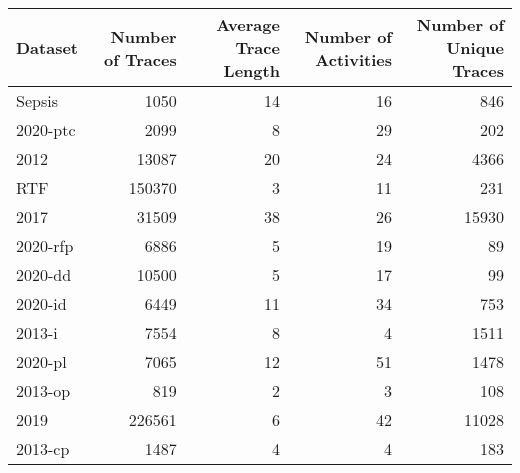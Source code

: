 \begin{tabular}{lrrrr}
\toprule
Dataset & Number of Traces & Average Trace Length & Number of Activities & Number of Unique Traces \\
\midrule
Sepsis & 1050 & 14 & 16 & 846 \\
2020-ptc & 2099 & 8 & 29 & 202 \\
2012 & 13087 & 20 & 24 & 4366 \\
RTF & 150370 & 3 & 11 & 231 \\
2017 & 31509 & 38 & 26 & 15930 \\
2020-rfp & 6886 & 5 & 19 & 89 \\
2020-dd & 10500 & 5 & 17 & 99 \\
2020-id & 6449 & 11 & 34 & 753 \\
2013-i & 7554 & 8 & 4 & 1511 \\
2020-pl & 7065 & 12 & 51 & 1478 \\
2013-op & 819 & 2 & 3 & 108 \\
2019 & 226561 & 6 & 42 & 11028 \\
2013-cp & 1487 & 4 & 4 & 183 \\
\bottomrule
\end{tabular}
